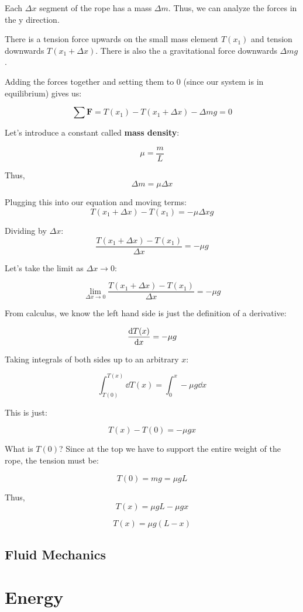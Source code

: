 \documentclass{report}
\begin{document}
Each $\Delta x$ segment of the rope has a mass $\Delta m$. Thus, we can analyze the forces in the y direction.

There is a tension force upwards on the small mass element $T(x_1)$ and tension downwards $T(x_1+\Delta x)$. There is also the a gravitational force downwards $\Delta m g$.

Adding the forces together and setting them to 0 (since our system is in equilibrium) gives us:


$$\sum \mathbf{F} = T(x_1)-T(x_1+\Delta x) - \Delta m g = 0$$

Let's introduce a constant called \textbf{mass density}:

$$\mu = \frac{m}{L}$$

Thus,
$$\Delta m = \mu\Delta x$$

Plugging this into our equation and moving terms:
$$T(x_1+\Delta x)-T(x_1) = -\mu\Delta x g $$

Dividing by $\Delta x$:
$$\frac{T(x_1+\Delta x)-T(x_1)}{\Delta x} = -\mu g$$

Let's take the limit as $\Delta x \to 0$:

$$\lim_{\Delta x \to 0}\frac{T(x_1+\Delta x)-T(x_1)}{\Delta x} = -\mu g$$

From calculus, we know the left hand side is just the definition of a derivative:

$$\dv{T(x)}{x} = -\mu g$$

Taking integrals of both sides up to an arbitrary $x$:

$$\int_{T(0)}^{T(x)} \dd T(x) = \int_0^x-\mu g \dd x$$

This is just:

$$T(x) - T(0) = -\mu g x$$


What is $T(0)$?
Since at the top we have to support the entire weight of the rope, the tension must be:

$$T(0) = mg = \mu g L$$

Thus,
$$T(x) = \mu g L- \mu g x$$

$$\boxed{
T(x) = \mu g(L-x)
}$$


\section{Fluid Mechanics}




\chapter{Energy}
\end{document}
